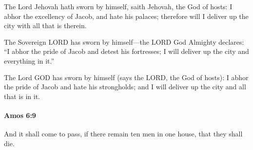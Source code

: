 			\begin{versebox}
					\item[BHS] 
					\item[LXX] 
					\item[ASV] The Lord Jehovah hath sworn by himself, saith Jehovah, the God of hosts: I abhor the excellency of Jacob, and hate his palaces; therefore will I deliver up the city with all that is therein.
					\item[NIV] The Sovereign LORD has sworn by himself—the LORD God Almighty declares: “I abhor the pride of Jacob and detest his fortresses; I will deliver up the city and everything in it.”
					\item[NRSV] The Lord GOD has sworn by himself (says the LORD, the God of hosts): I abhor the pride of Jacob and hate his strongholds; and I will deliver up the city and all that is in it.
			\end{versebox}

		\paragraph{Amos 6:9} %
			\label{AMOS-6-9}

			And it shall come to pass, if there remain ten men in one house, that they shall die.


